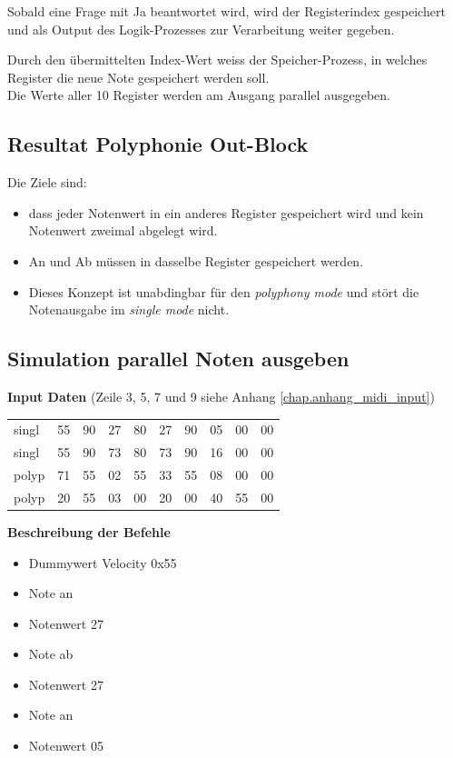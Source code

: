 Sobald eine Frage mit Ja beantwortet wird, wird der Registerindex gespeichert und als Output des Logik-Prozesses zur Verarbeitung weiter gegeben.

Durch den übermittelten Index-Wert weiss der Speicher-Prozess, in welches Register die neue Note gespeichert werden soll.\\
Die Werte aller 10 Register werden am Ausgang parallel ausgegeben.

\subsection{Resultat Polyphonie Out-Block}\label{test_polypohne}

Die Ziele sind:

\begin{itemize}
    \item dass jeder Notenwert in ein anderes Register gespeichert wird und kein Notenwert zweimal abgelegt wird.
    \item An und Ab müssen in dasselbe Register gespeichert werden.
    \item Dieses Konzept ist unabdingbar für den \textit{polyphony mode} und stört die Notenausgabe im \textit{single mode} nicht. 
\end{itemize}


\subsection{Simulation parallel Noten ausgeben}

\textbf{Input Daten} (Zeile 3, 5, 7 und 9 siehe Anhang \ref{chap.anhang_midi_input})

{
\renewcommand{\arraystretch}{1.0} %
\begin{tabular*}{\textwidth}{@{}@{\extracolsep{\fill}}*{10}{l}@{}} %
singl & 55 & 90 & 27 & 80 & 27 & 90 & 05 & 00 & 00\\
singl & 55 & 90 & 73 & 80 & 73 & 90 & 16 & 00 & 00\\
polyp & 71 & 55 & 02 & 55 & 33 & 55 & 08 & 00 & 00\\
polyp & 20 & 55 & 03 & 00 & 20 & 00 & 40 & 55 & 00
\end{tabular*}
}

\textbf{Beschreibung der Befehle}

\begin{itemize}
\item Dummywert Velocity 0x55
\item Note an 
\item Notenwert 27
\item Note ab 
\item Notenwert 27
\item Note an
\item Notenwert 05
\end{itemize}

